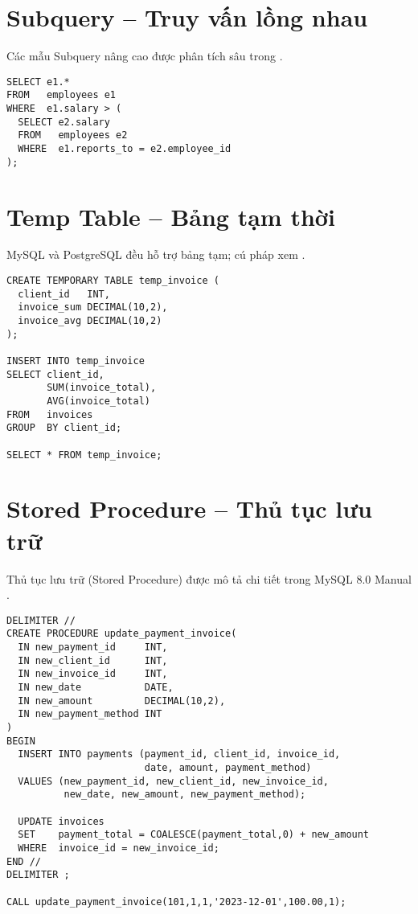 \section{Subquery – Truy vấn lồng nhau}

Các mẫu Subquery nâng cao được phân tích sâu trong \cite{celko2015}.

\begin{lstlisting}[caption={Subquery tìm nhân viên lương cao hơn quản lý}]
SELECT e1.*
FROM   employees e1
WHERE  e1.salary > (
  SELECT e2.salary
  FROM   employees e2
  WHERE  e1.reports_to = e2.employee_id
);
\end{lstlisting}

\section{Temp Table – Bảng tạm thời}

MySQL và PostgreSQL đều hỗ trợ bảng tạm; cú pháp xem \cite{mysql_manual,postgresql_docs}.

\begin{lstlisting}[caption={Tạo và sử dụng bảng tạm}]
CREATE TEMPORARY TABLE temp_invoice (
  client_id   INT,
  invoice_sum DECIMAL(10,2),
  invoice_avg DECIMAL(10,2)
);

INSERT INTO temp_invoice
SELECT client_id,
       SUM(invoice_total),
       AVG(invoice_total)
FROM   invoices
GROUP  BY client_id;

SELECT * FROM temp_invoice;
\end{lstlisting}

\section{Stored Procedure – Thủ tục lưu trữ}

Thủ tục lưu trữ (Stored Procedure) được mô tả chi tiết trong MySQL 8.0 Manual \cite{mysql_manual}.

\begin{lstlisting}[caption={Thủ tục cập nhật thanh toán và hóa đơn}]
DELIMITER //
CREATE PROCEDURE update_payment_invoice(
  IN new_payment_id     INT,
  IN new_client_id      INT,
  IN new_invoice_id     INT,
  IN new_date           DATE,
  IN new_amount         DECIMAL(10,2),
  IN new_payment_method INT
)
BEGIN
  INSERT INTO payments (payment_id, client_id, invoice_id,
                        date, amount, payment_method)
  VALUES (new_payment_id, new_client_id, new_invoice_id,
          new_date, new_amount, new_payment_method);

  UPDATE invoices
  SET    payment_total = COALESCE(payment_total,0) + new_amount
  WHERE  invoice_id = new_invoice_id;
END //
DELIMITER ;

CALL update_payment_invoice(101,1,1,'2023-12-01',100.00,1);
\end{lstlisting}

